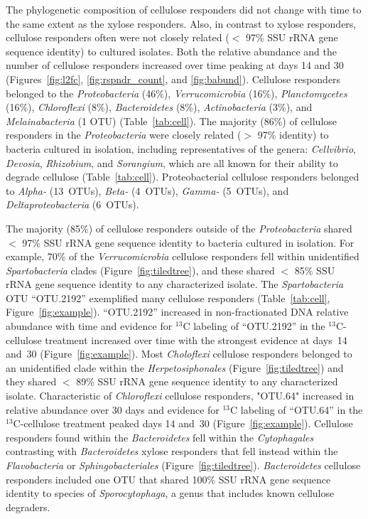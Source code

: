 The phylogenetic composition of cellulose responders did not change with time
to the same extent as the xylose responders. Also, in contrast to xylose
responders, cellulose responders often were not closely related ($<$ 97\% SSU
rRNA gene sequence identity) to cultured isolates. Both the relative abundance
and the number of cellulose responders increased over time peaking at days 14
and 30 (Figures~\ref{fig:l2fc}, \ref{fig:rspndr_count}, and \ref{fig:babund}).
Cellulose responders belonged to the \textit{Proteobacteria} (46\%),
\textit{Verrucomicrobia} (16\%), \textit{Planctomycetes} (16\%),
\textit{Chloroflexi} (8\%), \textit{Bacteroidetes} (8\%),
\textit{Actinobacteria} (3\%), and \textit{Melainabacteria} (1 OTU)
(Table~\ref{tab:cell}). The majority (86\%) of cellulose responders in the
\textit{Proteobacteria} were closely related ($>$ 97\% identity) to bacteria
cultured in isolation, including representatives of the genera:
\textit{Cellvibrio}, \textit{Devosia}, \textit{Rhizobium}, and
\textit{Sorangium}, which are all known for their ability to degrade cellulose
(Table~\ref{tab:cell}). Proteobacterial cellulose responders belonged to
\textit{Alpha-} (13~OTUs), \textit{Beta-} (4~OTUs), \textit{Gamma-} (5~OTUs),
and \textit{Deltaproteobacteria} (6~OTUs). 

The majority (85\%) of cellulose responders outside of the
\textit{Proteobacteria} shared  $<$ 97\% SSU rRNA gene sequence identity to
bacteria cultured in isolation. For example, 70\% of the
\textit{Verrucomicrobia} cellulose responders fell within unidentified
\textit{Spartobacteria} clades (Figure~\ref{fig:tiledtree}), and these shared $<$
85\% SSU rRNA gene sequence identity to any characterized isolate. The
\textit{Spartobacteria} OTU ``OTU.2192'' exemplified many cellulose responders
(Table~\ref{tab:cell}, Figure~\ref{fig:example}).
``OTU.2192'' increased in non-fractionated DNA relative abundance with time and
evidence for $^{13}$C labeling of ``OTU.2192'' in the $^{13}$C-cellulose
treatment increased over time with the strongest evidence at days~14 and~30
(Figure~\ref{fig:example}). Most \textit{Choloflexi} cellulose responders
belonged to an unidentified clade within the \textit{Herpetosiphonales}
(Figure~\ref{fig:tiledtree}) and they shared $<$ 89\% SSU rRNA gene sequence
identity to any characterized isolate. Characteristic of \textit{Chloroflexi}
cellulose responders, "OTU.64" increased in relative abundance over 30 days and
evidence for $^{13}$C labeling of ``OTU.64'' in the $^{13}$C-cellulose
treatment peaked days 14 and~30 (Figure~\ref{fig:example}). Cellulose
responders found within the \textit{Bacteroidetes} fell within the
\textit{Cytophagales} contrasting with \textit{Bacteroidetes} xylose responders
that fell instead within the \textit{Flavobacteria} or
\textit{Sphingobacteriales} (Figure~\ref{fig:tiledtree}).
\textit{Bacteroidetes} cellulose responders included one OTU that shared 100\%
SSU rRNA gene sequence identity to species of \textit{Sporocytophaga}, a genus
that includes known cellulose degraders.

